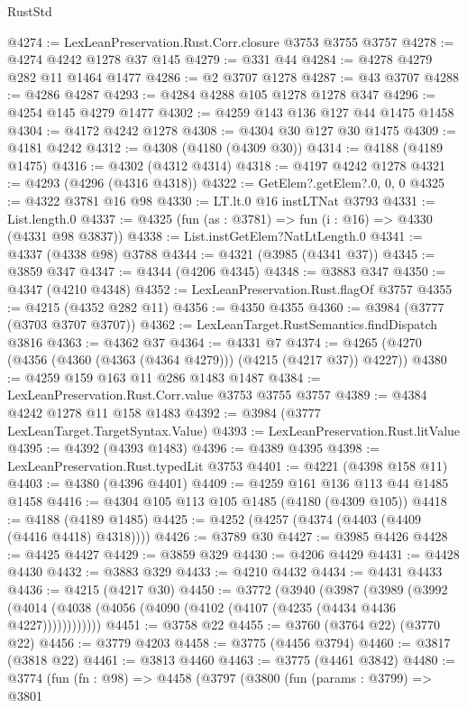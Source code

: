 \begin{lexlean}{RustStd}
\begin{coremodule}
{\begin{coremodule}
{{{{{{{{{{{{{{{{{{{{{{{{{{{{{{{@4274 := LexLeanPreservation.Rust.Corr.closure @3753 @3755 @3757
@4278 := @4274 @4242 @1278 @37 @145
@4279 := @331 @44
@4284 := @4278 @4279 @282 @11 @1464 @1477
@4286 := @2 @3707 @1278
@4287 := @43 @3707
@4288 := @4286 @4287
@4293 := @4284 @4288 @105 @1278 @1278 @347
@4296 := @4254 @145 @4279 @1477
@4302 := @4259 @143 @136 @127 @44 @1475 @1458
@4304 := @4172 @4242 @1278
@4308 := @4304 @30 @127 @30 @1475
@4309 := @4181 @4242
@4312 := @4308 (@4180 (@4309 @30))
@4314 := @4188 (@4189 @1475)
@4316 := @4302 (@4312 @4314)
@4318 := @4197 @4242 @1278
@4321 := @4293 (@4296 (@4316 @4318))
@4322 := GetElem?.getElem?.{0, 0, 0}
@4325 := @4322 @3781 @16 @98
@4330 := LT.lt.{0} @16 instLTNat @3793
@4331 := List.length.{0}
@4337 := @4325 (fun (as : @3781) => fun (i : @16) => @4330 (@4331 @98 @3837))
@4338 := List.instGetElem?NatLtLength.{0}
@4341 := @4337 (@4338 @98) @3788
@4344 := @4321 (@3985 (@4341 @37))
@4345 := @3859 @347
@4347 := @4344 (@4206 @4345)
@4348 := @3883 @347
@4350 := @4347 (@4210 @4348)
@4352 := LexLeanPreservation.Rust.flagOf @3757
@4355 := @4215 (@4352 @282 @11)
@4356 := @4350 @4355
@4360 := @3984 (@3777 (@3703 @3707 @3707))
@4362 := LexLeanTarget.RustSemantics.findDispatch @3816
@4363 := @4362 @37
@4364 := @4331 @7
@4374 := @4265 (@4270 (@4356 (@4360 (@4363 (@4364 @4279))) (@4215 (@4217 @37)) @4227))
@4380 := @4259 @159 @163 @11 @286 @1483 @1487
@4384 := LexLeanPreservation.Rust.Corr.value @3753 @3755 @3757
@4389 := @4384 @4242 @1278 @11 @158 @1483
@4392 := @3984 (@3777 LexLeanTarget.TargetSyntax.Value)
@4393 := LexLeanPreservation.Rust.litValue
@4395 := @4392 (@4393 @1483)
@4396 := @4389 @4395
@4398 := LexLeanPreservation.Rust.typedLit @3753
@4401 := @4221 (@4398 @158 @11)
@4403 := @4380 (@4396 @4401)
@4409 := @4259 @161 @136 @113 @44 @1485 @1458
@4416 := @4304 @105 @113 @105 @1485 (@4180 (@4309 @105))
@4418 := @4188 (@4189 @1485)
@4425 := @4252 (@4257 (@4374 (@4403 (@4409 (@4416 @4418) @4318))))
@4426 := @3789 @30
@4427 := @3985 @4426
@4428 := @4425 @4427
@4429 := @3859 @329
@4430 := @4206 @4429
@4431 := @4428 @4430
@4432 := @3883 @329
@4433 := @4210 @4432
@4434 := @4431 @4433
@4436 := @4215 (@4217 @30)
@4450 := @3772
    (@3940
      (@3987
        (@3989
          (@3992 (@4014 (@4038 (@4056 (@4090 (@4102 (@4107 (@4235 (@4434 @4436 @4227))))))))))))
@4451 := @3758 @22
@4455 := @3760 (@3764 @22) (@3770 @22)
@4456 := @3779 @4203
@4458 := @3775 (@4456 @3794)
@4460 := @3817 (@3818 @22)
@4461 := @3813 @4460
@4463 := @3775 (@4461 @3842)
@4480 := @3774
    (fun (fn : @98) =>
    @4458
      (@3797
        (@3800
          (fun (params : @3799) =>
          @3801
}}}}}}}}}}}}}}}}}}}}}}}}}}}}}}}
\end{coremodule}}
\end{coremodule}
\end{lexlean}
